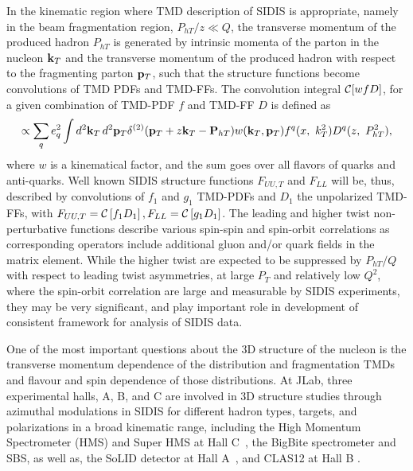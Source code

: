 In the kinematic region where TMD description of SIDIS is appropriate, namely in the beam fragmentation region, $P_{hT}/z \ll Q$, the transverse momentum of the produced hadron $P_{hT}$ is generated by intrinsic momenta of the parton in the nucleon ${\bf k}_T$ and the transverse momentum of the produced hadron with respect to the fragmenting parton ${\bf p}_T$, such that
the structure functions become convolutions of TMD PDFs and TMD-FFs. The convolution integral ${\cal C}[w f D]$, for a given combination of TMD-PDF $f$ and TMD-FF $D$ is defined as~\cite{Bacchetta:2006tn}
\begin{eqnarray}
\propto \sum_q e_q^2 \int d^2{\bf k}_T \, d^2{\bf p}_T \delta^{(2)}({\bf p}_T + z{\bf k}_T - {\bf P}_{hT}) w({\bf k}_T, {\bf p}_T) f^{q}(x, ~k_T^2) D^{q}(z,~P_{hT}^2), 
\label{Eq:convo}
\end{eqnarray}
where $w$ is a kinematical factor, and the sum goes over all flavors of quarks and anti-quarks.
Well known SIDIS structure functions $F_{UU,T}$ and $F_{LL}$ will be, thus, described by convolutions
of $f_1$ and $g_1$ TMD-PDFs and $D_1$ the unpolarized TMD-FFs, with $F_{UU,T} =  {\cal{C}}\left[ f_1 D_1 \right], F_{LL}  =  {\cal{C}}\left[ g_1 D_1 \right]$. %
The leading and higher twist non-perturbative functions
describe various spin-spin and spin-orbit correlations as corresponding operators include additional gluon and/or quark fields in the matrix element.
While the higher twist are expected to be suppressed by $P_{hT}/Q$ with respect to leading twist asymmetries, at large $P_T$ and relatively low $Q^2$, where the spin-orbit correlation are large and measurable by SIDIS experiments, they may be very significant, and play important role in development of consistent framework for analysis of SIDIS data.

One of the most important questions about the 3D structure of the nucleon is the transverse momentum dependence of the distribution and fragmentation TMDs and flavour and spin dependence of those distributions. %
At JLab, three experimental halls, A, B, and C are involved in 3D structure studies through azimuthal modulations in SIDIS for different hadron types, targets, and polarizations in a broad kinematic range, including the High Momentum Spectrometer (HMS) and Super HMS at Hall C~\cite{E12-06-104,E12-09-017,E12-13-007}, the BigBite spectrometer and SBS\cite{E12-09-018}, as well as, the SoLID detector at Hall A~\cite{SoLID-SIDIS-p,SoLID-SIDIS-He3-T,SoLID-SIDIS-He3-L}, and CLAS12 at Hall B \cite{E12-06-112,E12-07-107,E12-09-008,E12-09-009,C12-20-002}. 



